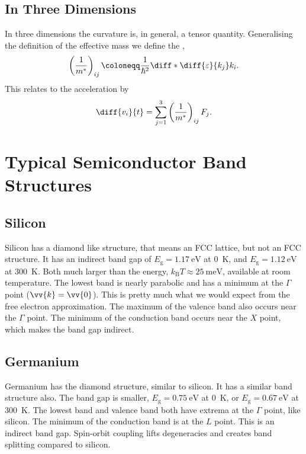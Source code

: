 \documentclass[fleqn]{NotesClass}
\newcommand*{\boltzmann}{k_{\mathrm{B}}}
\begin{document}
    \subsection{In Three Dimensions}
    In three dimensions the curvature is, in general, a tensor quantity.
    Generalising the definition of the effective mass we define the ,
    \begin{equation}
        \left( \frac{1}{m^*} \right)_{ij} \coloneqq \frac{1}{\hbar^2} \diff*{\diff{\varepsilon}{k_j}}{k_i}.
    \end{equation}
    This relates to the acceleration by
    \begin{equation}
        \diff{v_i}{t} = \sum_{j=1}^{3} \left( \frac{1}{m^*} \right)_{ij}F_j.
    \end{equation}
    
    \section{Typical Semiconductor Band Structures}
    \subsection{Silicon}
    Silicon has a diamond like structure, that means an FCC lattice, but not an FCC structure.
    It has an indirect band gap of \(E_{\mathrm{g}} = \qty{1.17}{\electronvolt}\) at \qty{0}{\kelvin}, and \(E_{\mathrm{g}} = \qty{1.12}{\electronvolt}\) at \qty{300}{\kelvin}.
    Both much larger than the energy, \(\boltzmann T \approx \qty{25}{\milli\electronvolt}\), available at room temperature.
    The lowest band is nearly parabolic and has a minimum at the \(\Gamma\) point (\(\vv{k} = \vv{0}\)).
    This is pretty much what we would expect from the free electron approximation.
    The maximum of the valence band also occurs near the \(\Gamma\) point.
    The minimum of the conduction band occurs near the \(X\) point, which makes the band gap indirect.
    
    \subsection{Germanium}
    Germanium has the diamond structure, similar to silicon.
    It has a similar band structure also.
    The band gap is smaller, \(E_{\mathrm{g}} = \qty{0.75}{\electronvolt}\) at \qty{0}{\kelvin}, or \(E_{\mathrm{g}} = \qty{0.67}{\electronvolt}\) at \qty{300}{\kelvin}.
    The lowest band and valence band both have extrema at the \(\Gamma\) point, like silicon.
    The minimum of the conduction band is at the \(L\) point.
    This is an indirect band gap.
    Spin-orbit coupling lifts degeneracies and creates band splitting compared to silicon.
    
\end{document}
